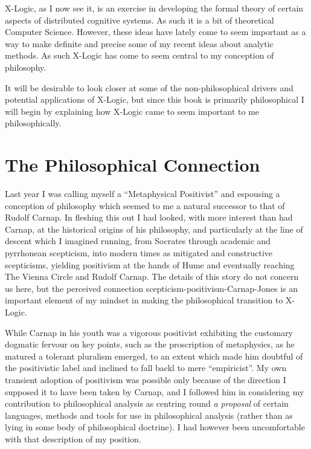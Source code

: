 X-Logic, as I now see it, is an exercise in developing the formal theory of certain aspects of distributed cognitive systems.
As such it is a bit of theoretical Computer Science.
However, these ideas have lately come to seem important as a way to make definite and precise some of my recent ideas about analytic methods.
As such X-Logic has come to seem central to my conception of philosophy.

It will be desirable to look closer at some of the non-philosophical drivers and potential applications of X-Logic, but since this book is primarily philosophical I will begin by explaining how X-Logic came to seem important to me philosophically.

\section{The Philosophical Connection}

Last year I was calling myself a ``Metaphysical Positivist'' and espousing a conception of philosophy which seemed to me a natural successor to that of Rudolf Carnap.
In fleshing this out I had looked, with more interest than had Carnap, at the historical origins of his philosophy, and particularly at the line of descent which I imagined running, from Socrates through academic and pyrrhonean scepticism, into modern times as mitigated and constructive scepticisms, yielding positivism at the hands of Hume and eventually reaching The Vienna Circle and Rudolf Carnap.
The details of this story do not concern us here, but the perceived connection scepticism-positivism-Carnap-Jones is an important element of my mindset in making the philosophical transition to X-Logic.

While Carnap in his youth was a vigorous positivist exhibiting the customary dogmatic fervour on key points, such as the proscription of metaphysics, as he matured a tolerant pluralism emerged, to an extent which made him doubtful of the positivistic label and inclined to fall backl to mere ``empiricist''.
My own transient adoption of positivism was possible only because of the direction I supposed it to have been taken by Carnap, and I followed him in considering my contribution to philosophical analysis as centring round {\it a proposal} of certain languages, methods and tools for use in philosophical analysis (rather than as lying in some body of philosophical doctrine).
I had however been uncomfortable with that description of my position.


